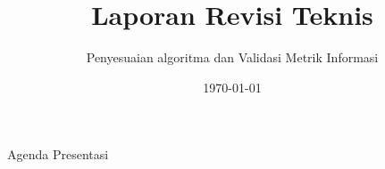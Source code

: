 \documentclass[aspectratio=169]{beamer}
\title[Revisi GTQuantumInvest]{Laporan Revisi Teknis}
\subtitle{Penyesuaian algoritma dan Validasi Metrik Informasi}
\date{\today}
\begin{document}
\begin{frame}
    \titlepage
\end{frame}

\begin{frame}{Agenda Presentasi}
    \tableofcontents[hideallsubsections]
\end{frame}





\end{document}
